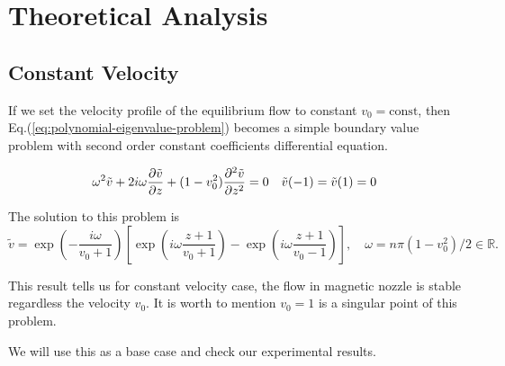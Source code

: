 \chapter{Theoretical Analysis} \label{chap:theoretical_analysis}
\section{Constant Velocity}
If we set the velocity profile of the equilibrium flow to constant $v_0=\text{const}$, then Eq.(\ref{eq:polynomial-eigenvalue-problem}) becomes a simple boundary value problem with second order constant coefficients differential equation.

\begin{equation} \label{eq:constant_v_problem_dirichlet}
    \omega^2\tilde{v} + 2i\omega\pdv{\tilde{v}}{z} + (1-v_0^2)\pdv[2]{\tilde{v}}{z} = 0
    \quad
    \tilde{v}(-1) = \tilde{v}(1) = 0
\end{equation}

The solution to this problem is
\begin{equation} \label{eq:constant_v_solution_dirichlet}
    \tilde{v} = \exp\left(-\frac{i\omega}{v_0+1}\right)
\left[ \exp\left(i\omega\frac{z+1}{v_0+1}\right) - \exp\left(i\omega\frac{z+1}{v_0-1}\right) \right], \quad \omega=n\pi(1-v_0^2)/2 \in \mathbb{R}.
\end{equation}

This result tells us for constant velocity case, the flow in magnetic nozzle is stable regardless the velocity $v_0$. It is worth to mention $v_0=1$ is a singular point of this problem.

We will use this as a base case and check our experimental results. 

